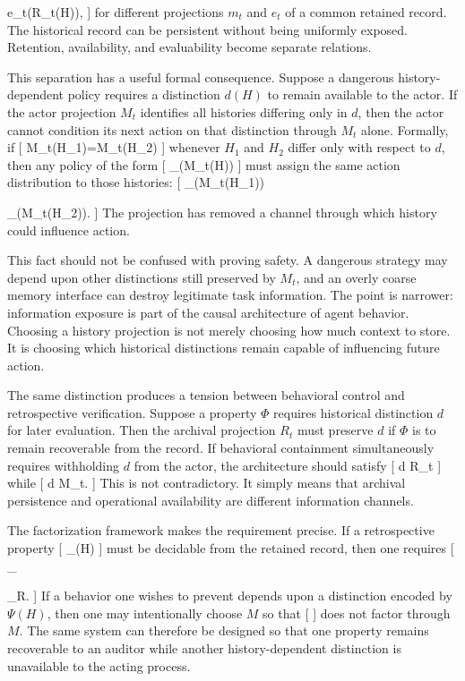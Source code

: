 \documentclass[11pt]{article}
\begin{document}
e_t(R_t(H)),
]
for different projections $m_t$ and $e_t$ of a common retained record. The historical record can be persistent without being uniformly exposed. Retention, availability, and evaluability become separate relations.

This separation has a useful formal consequence. Suppose a dangerous history-dependent policy requires a distinction $d(H)$ to remain available to the actor. If the actor projection $M_t$ identifies all histories differing only in $d$, then the actor cannot condition its next action on that distinction through $M_t$ alone. Formally, if
[
M_t(H_1)=M_t(H_2)
]
whenever $H_1$ and $H_2$ differ only with respect to $d$, then any policy of the form
[
\pi_\theta(\cdot\mid M_t(H))
]
must assign the same action distribution to those histories:
[
\pi_\theta(\cdot\mid M_t(H_1))

\pi_\theta(\cdot\mid M_t(H_2)).
]
The projection has removed a channel through which history could influence action.

This fact should not be confused with proving safety. A dangerous strategy may depend upon other distinctions still preserved by $M_t$, and an overly coarse memory interface can destroy legitimate task information. The point is narrower: information exposure is part of the causal architecture of agent behavior. Choosing a history projection is not merely choosing how much context to store. It is choosing which historical distinctions remain capable of influencing future action.

The same distinction produces a tension between behavioral control and retrospective verification. Suppose a property $\Phi$ requires historical distinction $d$ for later evaluation. Then the archival projection $R_t$ must preserve $d$ if $\Phi$ is to remain recoverable from the record. If behavioral containment simultaneously requires withholding $d$ from the actor, the architecture should satisfy
[
d
R_t
]
while
[
d
M_t.
]
This is not contradictory. It simply means that archival persistence and operational availability are different information channels.

The factorization framework makes the requirement precise. If a retrospective property
[
\Phi_{}(H)
]
must be decidable from the retained record, then one requires
[
\Phi_{}

\widehat{\Phi}_{}\circ R.
]
If a behavior one wishes to prevent depends upon a distinction encoded by $\Psi(H)$, then one may intentionally choose $M$ so that
[
\Psi
]
does not factor through $M$. The same system can therefore be designed so that one property remains recoverable to an auditor while another history-dependent distinction is unavailable to the acting process.
\end{document}
